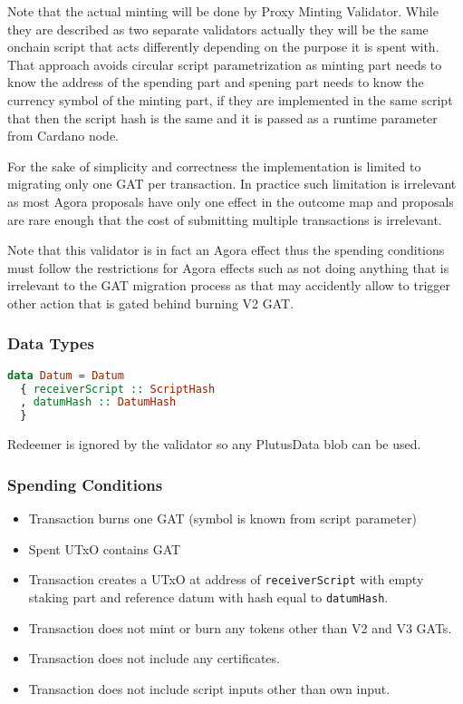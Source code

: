 \documentclass{article}
\begin{document}
Note that the actual minting will be done by Proxy Minting Validator.
While they are described as two separate validators actually they will be the same onchain script that acts differently depending on the purpose it is spent with.
That approach avoids circular script parametrization as minting part needs to know the address of the spending part and spening part needs to know the currency symbol of the minting part, if they are implemented in the same script that then the script hash is the same and it is passed as a runtime parameter from Cardano node.

For the sake of simplicity and correctness the implementation is limited to migrating only one GAT per transaction.
In practice such limitation is irrelevant as most Agora proposals have only one effect in the outcome map and proposals are rare enough that the cost of submitting multiple transactions is irrelevant.

Note that this validator is in fact an Agora effect thus the spending conditions must follow the restrictions for Agora effects such as not doing anything that is irrelevant to the GAT migration process as that may accidently allow to trigger other action that is gated behind burning V2 GAT.

\subsubsection*{Data Types}

\begin{lstlisting}[language=Haskell]
data Datum = Datum
  { receiverScript :: ScriptHash
  , datumHash :: DatumHash
  }
\end{lstlisting}

Redeemer is ignored by the validator so any PlutusData blob can be used.

\subsubsection*{Spending Conditions}

\begin{itemize}
  \item Transaction burns one GAT (symbol is known from script parameter)
  \item Spent UTxO contains GAT
  \item Transaction creates a UTxO at address of \verb|receiverScript| with empty staking part and reference datum with hash equal to \verb|datumHash|.
  \item Transaction does not mint or burn any tokens other than V2 and V3 GATs.
  \item Transaction does not include any certificates.
  \item Transaction does not include script inputs other than own input.
\end{itemize}
\end{document}
